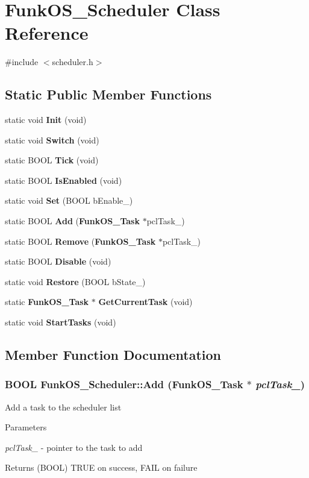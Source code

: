 \section{FunkOS\_\-Scheduler Class Reference}
\label{class_funk_o_s___scheduler}


{\ttfamily \#include $<$scheduler.h$>$}\subsection*{Static Public Member Functions}
\begin{DoxyCompactItemize}
\item 
static void {\bf Init} (void)
\item 
static void {\bf Switch} (void)
\item 
static BOOL {\bf Tick} (void)
\item 
static BOOL {\bf IsEnabled} (void)
\item 
static void {\bf Set} (BOOL bEnable\_\-)
\item 
static BOOL {\bf Add} ({\bf FunkOS\_\-Task} $\ast$pclTask\_\-)
\item 
static BOOL {\bf Remove} ({\bf FunkOS\_\-Task} $\ast$pclTask\_\-)
\item 
static BOOL {\bf Disable} (void)
\item 
static void {\bf Restore} (BOOL bState\_\-)
\item 
static {\bf FunkOS\_\-Task} $\ast$ {\bf GetCurrentTask} (void)
\item 
static void {\bf StartTasks} (void)
\end{DoxyCompactItemize}


\subsection{Member Function Documentation}
\subsubsection[{Add}]{\setlength{\rightskip}{0pt plus 5cm}BOOL FunkOS\_\-Scheduler::Add ({\bf FunkOS\_\-Task} $\ast$ {\em pclTask\_\-})\hspace{0.3cm}{\ttfamily  [static]}}\label{class_funk_o_s___scheduler_a8c06d7006e04ec02b18bc7c85509c9a5}
Add a task to the scheduler list


\begin{DoxyParams}{Parameters}
\item[{\em pclTask\_\-}]-\/ pointer to the task to add \end{DoxyParams}
\begin{DoxyReturn}{Returns}
(BOOL) TRUE on success, FAIL on failure 
\end{DoxyReturn}
